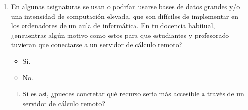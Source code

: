 \documentclass[a4paper,12pt]{article}
\begin{document}
\begin{enumerate}
\item En algunas asignaturas se usan o podrían usarse bases de datos grandes y/o una intensidad de
      computación elevada, que son difíciles de implementar en los ordenadores de un aula de
      informática. En tu docencia habitual, ¿encuentras algún motivo como estos para que estudiantes
      y profesorado tuvieran que conectarse a un servidor de cálculo remoto?
   \begin{itemize}
   \item Sí.
   \item No.
   \end{itemize}

   \begin{enumerate}
   \item Si es así, ¿puedes concretar qué recurso sería más accesible a través de un servidor de 
         cálculo remoto?
   \vspace*{1cm}
   \end{enumerate}
\end{enumerate}



\end{document}
